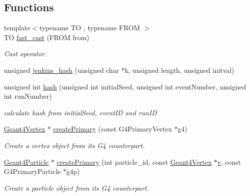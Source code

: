 \subsection*{Functions}
\begin{DoxyCompactItemize}
\item 
{\footnotesize template$<$typename TO , typename F\+R\+OM $>$ }\\TO \hyperlink{namespace_d_d4hep_1_1_simulation_a335c0c2dda54e31d3526712b906bb0bb}{fast\+\_\+cast} (F\+R\+OM from)
\begin{DoxyCompactList}\small\item\em Cast operator. \end{DoxyCompactList}\item 
unsigned \hyperlink{namespace_d_d4hep_1_1_simulation_a7a70f98f660222ddbf5b8dea8ffd1bb6}{jenkins\+\_\+hash} (unsigned char $\ast$k, unsigned length, unsigned initval)
\item 
unsigned int \hyperlink{namespace_d_d4hep_1_1_simulation_ae0f666f5766acb8613abdf7257606965}{hash} (unsigned int initial\+Seed, unsigned int event\+Number, unsigned int run\+Number)
\begin{DoxyCompactList}\small\item\em calculate hash from initial\+Seed, event\+ID and run\+ID \end{DoxyCompactList}\item 
\hyperlink{class_d_d4hep_1_1_simulation_1_1_geant4_vertex}{Geant4\+Vertex} $\ast$ \hyperlink{namespace_d_d4hep_1_1_simulation_ab6d15d53b34ea70681d56870814d48b2}{create\+Primary} (const G4\+Primary\+Vertex $\ast$g4)
\begin{DoxyCompactList}\small\item\em Create a vertex object from it\textquotesingle{}s G4 counterpart. \end{DoxyCompactList}\item 
\hyperlink{class_d_d4hep_1_1_simulation_1_1_geant4_particle}{Geant4\+Particle} $\ast$ \hyperlink{namespace_d_d4hep_1_1_simulation_a4ba463edde87d20831a604346d29a129}{create\+Primary} (int particle\+\_\+id, const \hyperlink{class_d_d4hep_1_1_simulation_1_1_geant4_vertex}{Geant4\+Vertex} $\ast$\hyperlink{_multi_view_8cpp_a8320ee13ac034dbf6d624fe8953dd337}{v}, const G4\+Primary\+Particle $\ast$g4p)
\begin{DoxyCompactList}\small\item\em Create a particle object from it\textquotesingle{}s G4 counterpart. \end{DoxyCompactList}\item 

\end{DoxyCompactItemize}
